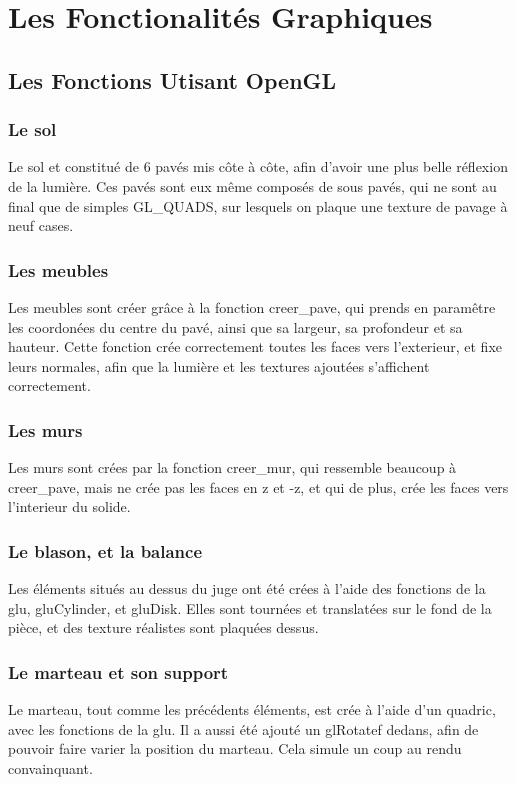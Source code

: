 \section{Les Fonctionalités Graphiques}

\subsection{Les Fonctions Utisant OpenGL}
	\subsubsection{Le sol}
	Le sol et constitué de 6 pavés mis côte à côte, afin d'avoir une plus belle réflexion de la lumière. Ces pavés sont eux même composés de sous pavés, qui ne sont au final que de simples GL\_QUADS, sur lesquels on plaque une texture de pavage à neuf cases.
	
	\subsubsection{Les meubles}
	Les meubles sont créer grâce à la fonction creer\_pave, qui prends en paramêtre les coordonées du centre du pavé, ainsi que sa largeur, sa profondeur et sa hauteur. Cette fonction crée correctement toutes les faces vers l'exterieur, et fixe leurs normales, afin que la lumière et les textures ajoutées s'affichent correctement.
	\subsubsection{Les murs}
	Les murs sont crées par la fonction creer\_mur, qui ressemble beaucoup à creer\_pave, mais ne crée pas les faces en z et -z, et qui de plus, crée les faces vers l'interieur du solide.
	\subsubsection{Le blason, et la balance}
	Les éléments situés au dessus du juge ont été crées à l'aide des fonctions de la glu, gluCylinder, et gluDisk. Elles sont tournées et translatées sur le fond de la pièce, et des texture réalistes sont plaquées dessus.
	\subsubsection{Le marteau et son support}
	Le marteau, tout comme les précédents éléments, est crée à l'aide d'un quadric, avec les fonctions de la glu. Il a aussi été ajouté un glRotatef dedans, afin de pouvoir faire varier la position du marteau. Cela simule un coup au rendu convainquant.
